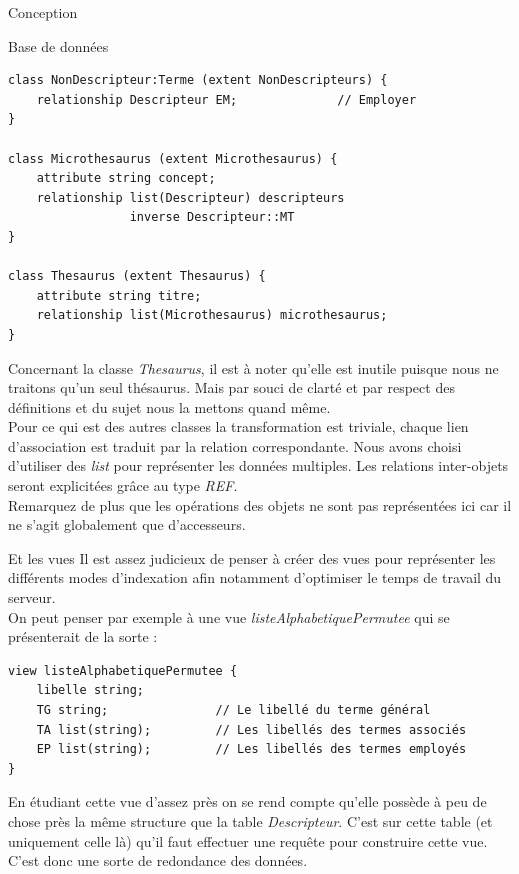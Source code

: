 \documentclass[a4paper, 12pt]{report}
\begin{document}
\begin{chapter}{Conception}
\begin{section}{Base de données}
\begin{verbatim}
class NonDescripteur:Terme (extent NonDescripteurs) {
	relationship Descripteur EM;              // Employer
}

class Microthesaurus (extent Microthesaurus) {
	attribute string concept;
	relationship list(Descripteur) descripteurs
	             inverse Descripteur::MT
}

class Thesaurus (extent Thesaurus) {
	attribute string titre;
	relationship list(Microthesaurus) microthesaurus;
}
	\end{verbatim}

	Concernant la classe \emph{Thesaurus}, il est à noter qu'elle est
	inutile puisque nous ne traitons qu'un seul thésaurus. Mais par souci de clarté et par respect des définitions et du sujet 
	nous la mettons quand même.\\


	Pour ce qui est des autres classes la transformation est triviale, chaque lien d'association est traduit par la relation
	correspondante. Nous avons choisi d'utiliser des \emph{list} pour représenter les données multiples. Les relations inter-objets seront
	explicitées grâce au type \emph{REF}.\\

	Remarquez de plus que les opérations des objets ne sont pas représentées ici car il ne s'agit globalement que d'accesseurs.\\
	\end{section}

	\begin{section}{Et les vues}
		Il est assez judicieux de penser à créer des vues pour représenter les différents modes d'indexation afin notamment d'optimiser le temps
		de travail du serveur. \\
		On peut penser par exemple à une vue \emph{listeAlphabetiquePermutee} qui se présenterait de la sorte :\\
		\begin{verbatim}
view listeAlphabetiquePermutee {
	libelle string;
	TG string;               // Le libellé du terme général
	TA list(string);         // Les libellés des termes associés
	EP list(string);         // Les libellés des termes employés
}
		\end{verbatim}

		En étudiant cette vue d'assez près on se rend compte qu'elle possède à peu de chose près la même structure que la table \emph{Descripteur}.
		C'est sur cette table (et uniquement celle là) qu'il faut effectuer une requête pour construire cette vue. C'est donc une sorte de redondance
		des données.\\


\end{section}
\end{chapter}
\end{document}
